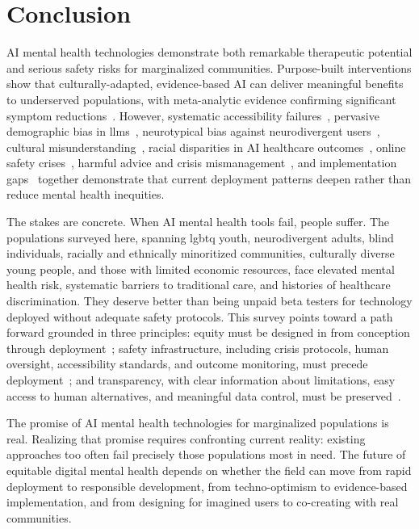 \section{Conclusion}

AI mental health technologies demonstrate both remarkable therapeutic potential and serious safety risks for marginalized communities. Purpose-built interventions show that culturally-adapted, evidence-based AI can deliver meaningful benefits to underserved populations, with meta-analytic evidence confirming significant symptom reductions~\cite{abd_alrazaq_2020,li_2023}. However, systematic accessibility failures~\cite{khan_seo_2025}, pervasive demographic bias in \gls{llm}s~\cite{omar_2025,pfohl_2024}, neurotypical bias against neurodivergent users~\cite{killian_2023}, cultural misunderstanding~\cite{aleem_2024}, racial disparities in AI healthcare outcomes~\cite{haider_2024,timmons_2023}, online safety crises~\cite{tanni_2024}, harmful advice and crisis mismanagement~\cite{de_freitas_2024,he_2022,neda_2023}, and implementation gaps~\cite{smith_2023} together demonstrate that current deployment patterns deepen rather than reduce mental health inequities.

The stakes are concrete. When AI mental health tools fail, people suffer. The populations surveyed here, spanning \gls{lgbtq} youth, neurodivergent adults, blind individuals, racially and ethnically minoritized communities, culturally diverse young people, and those with limited economic resources, face elevated mental health risk, systematic barriers to traditional care, and histories of healthcare discrimination. They deserve better than being unpaid beta testers for technology deployed without adequate safety protocols. This survey points toward a path forward grounded in three principles: equity must be designed in from conception through deployment~\cite{fowler_2023,khan_seo_2025,naderbagi_2024}; safety infrastructure, including crisis protocols, human oversight, accessibility standards, and outcome monitoring, must precede deployment~\cite{de_freitas_2024,smith_2023}; and transparency, with clear information about limitations, easy access to human alternatives, and meaningful data control, must be preserved~\cite{drydakis_2022,rollwage_2024}.

The promise of AI mental health technologies for marginalized populations is real. Realizing that promise requires confronting current reality: existing approaches too often fail precisely those populations most in need. The future of equitable digital mental health depends on whether the field can move from rapid deployment to responsible development, from techno-optimism to evidence-based implementation, and from designing for imagined users to co-creating with real communities.
